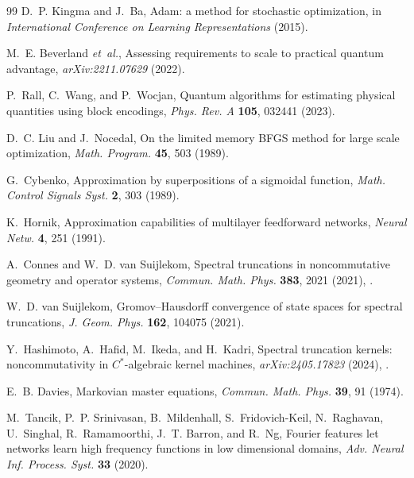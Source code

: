 \documentclass[twocolumn,aps,prxquantum,superscriptaddress,nofootinbib,floatfix,longbibliography]{revtex4-2}
\begin{document}
\begin{thebibliography}{99}
D.~P. Kingma and J.~Ba, Adam: a method for stochastic optimization, in \emph{International Conference on Learning Representations} (2015).

M.~E. Beverland \emph{et~al.}, Assessing requirements to scale to practical quantum advantage, \emph{arXiv:2211.07629} (2022).

P.~Rall, C.~Wang, and P.~Wocjan, Quantum algorithms for estimating physical quantities using block encodings, \emph{Phys. Rev. A} \textbf{105}, 032441 (2023).

D.~C. Liu and J.~Nocedal, On the limited memory BFGS method for large scale optimization, \emph{Math. Program.} \textbf{45}, 503 (1989).

G.~Cybenko, Approximation by superpositions of a sigmoidal function, \emph{Math. Control Signals Syst.} \textbf{2}, 303 (1989).

K.~Hornik, Approximation capabilities of multilayer feedforward networks, \emph{Neural Netw.} \textbf{4}, 251 (1991).

A.~Connes and W.~D. van Suijlekom, Spectral truncations in noncommutative geometry and operator systems, \emph{Commun. Math. Phys.} \textbf{383}, 2021 (2021), .

W.~D. van Suijlekom, Gromov--Hausdorff convergence of state spaces for spectral truncations, \emph{J. Geom. Phys.} \textbf{162}, 104075 (2021).

Y.~Hashimoto, A.~Hafid, M.~Ikeda, and H.~Kadri, Spectral truncation kernels: noncommutativity in $C^*$-algebraic kernel machines, \emph{arXiv:2405.17823} (2024), .

E.~B. Davies, Markovian master equations, \emph{Commun. Math. Phys.} \textbf{39}, 91 (1974).

M.~Tancik, P.~P. Srinivasan, B.~Mildenhall, S.~Fridovich-Keil, N.~Raghavan, U.~Singhal, R.~Ramamoorthi, J.~T. Barron, and R.~Ng, Fourier features let networks learn high frequency functions in low dimensional domains, \emph{Adv. Neural Inf. Process. Syst.} \textbf{33} (2020).


\end{thebibliography}
\end{document}
